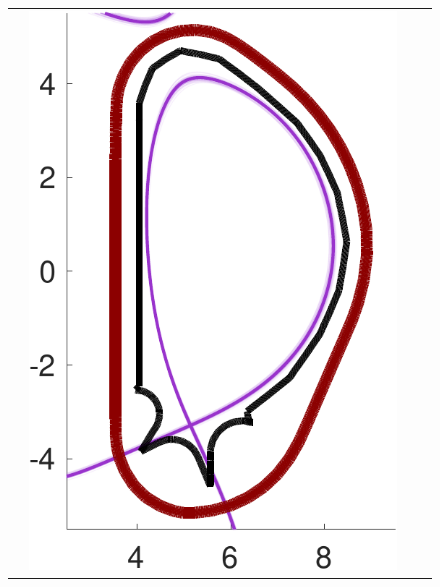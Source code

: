 \documentclass{beamer}
\begin{document}
\begin{frame}[t]
\begin{itemize}[leftmargin=5pt]
\begin{figure}[ht!]
{\begin{tabular}{cccc}
&\includegraphics[width=1\linewidth]{QoI_MFMC.pdf} 
\\

\end{tabular}}
\end{figure}
\end{itemize}
\end{frame}
\end{document}
